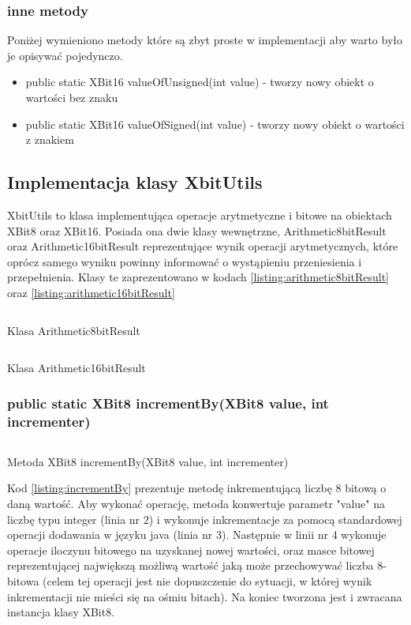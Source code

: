 \subsubsection{inne metody}
Poniżej wymieniono metody które są zbyt proste w implementacji aby warto było je opisywać pojedynczo. 
\begin{itemize}  
	\item public static XBit16 valueOfUnsigned(int value) - tworzy nowy obiekt o wartości bez znaku
	\item public static XBit16 valueOfSigned(int value) - tworzy nowy obiekt o wartości z znakiem
\end{itemize}


\subsection{Implementacja klasy XbitUtils}
XbitUtils to klasa implementująca operacje arytmetyczne i bitowe na obiektach XBit8 oraz XBit16. Posiada ona dwie klasy wewnętrzne, Arithmetic8bitResult oraz Arithmetic16bitResult reprezentujące wynik operacji arytmetycznych, które oprócz samego wyniku powinny informować o wystąpieniu przeniesienia i przepełnienia. Klasy te zaprezentowano w kodach \ref{listing:arithmetic8bitResult} oraz \ref{listing:arithmetic16bitResult}

\begin{listing}[h]
	\inputminted{java}{listings/xbit/arithmetic8bitResult.java}
	\caption{Klasa Arithmetic8bitResult}
	\label{listing:arithmetic8bitResult}
\end{listing}

\begin{listing}[h]
	\inputminted{java}{listings/xbit/arithmetic16bitResult.java}
	\caption{Klasa Arithmetic16bitResult}
	\label{listing:arithmetic16bitResult}
\end{listing}

\subsubsection{public static XBit8 incrementBy(XBit8 value, int incrementer)}
\begin{listing}[h]
	\inputminted{java}{listings/xbit/incrementBy.java}
	\caption{Metoda XBit8 incrementBy(XBit8 value, int incrementer)}
	\label{listing:incrementBy}
\end{listing}
Kod \ref{listing:incrementBy} prezentuje metodę inkrementującą liczbę 8 bitową o daną wartość. Aby wykonać operację, metoda konwertuje parametr "value" na liczbę typu integer (linia nr 2) i wykonuje inkrementacje za pomocą standardowej operacji dodawania w języku java (linia nr 3). Następnie w linii nr 4 wykonuje operacje iloczynu bitowego na uzyskanej nowej wartości, oraz masce bitowej reprezentującej największą możliwą wartość jaką może przechowywać liczba 8-bitowa (celem tej operacji jest nie dopuszczenie do sytuacji, w której wynik inkrementacji nie mieści się na ośmiu bitach). Na koniec tworzona jest i zwracana instancja klasy XBit8. 

